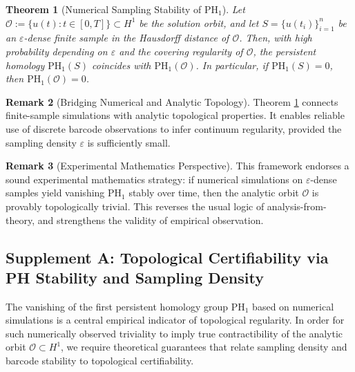 \documentclass[11pt]{article}
\newtheorem{theorem}{Theorem}[section]
\theoremstyle{definition}
\newtheorem{remark}[theorem]{Remark}
\begin{document}
\begin{theorem}[Numerical Sampling Stability of $\mathrm{PH}_1$]
\label{thm:niyogi_smale_weinberger}
Let $\mathcal{O} := \{u(t): t \in [0,T]\} \subset H^1$ be the solution orbit, and let $S = \{u(t_i)\}_{i=1}^n$ be an $\varepsilon$-dense finite sample in the Hausdorff distance of $\mathcal{O}$. Then, with high probability depending on $\varepsilon$ and the covering regularity of $\mathcal{O}$, the persistent homology $\mathrm{PH}_1(S)$ coincides with $\mathrm{PH}_1(\mathcal{O})$. In particular, if $\mathrm{PH}_1(S) = 0$, then $\mathrm{PH}_1(\mathcal{O}) = 0$.
\end{theorem}

\begin{remark}[Bridging Numerical and Analytic Topology]
Theorem \ref{thm:niyogi_smale_weinberger} connects finite-sample simulations with analytic topological properties. It enables reliable use of discrete barcode observations to infer continuum regularity, provided the sampling density $\varepsilon$ is sufficiently small.
\end{remark}

\begin{remark}[Experimental Mathematics Perspective]
This framework endorses a sound experimental mathematics strategy: if numerical simulations on $\varepsilon$-dense samples yield vanishing $\mathrm{PH}_1$ stably over time, then the analytic orbit $\mathcal{O}$ is provably topologically trivial. This reverses the usual logic of analysis-from-theory, and strengthens the validity of empirical observation.
\end{remark}

\subsection*{Supplement A: Topological Certifiability via PH Stability and Sampling Density}

The vanishing of the first persistent homology group $\mathrm{PH}_1$ based on numerical simulations is a central empirical indicator of topological regularity. In order for such numerically observed triviality to imply true contractibility of the analytic orbit $\mathcal{O} \subset H^1$, we require theoretical guarantees that relate sampling density and barcode stability to topological certifiability.
\end{document}
